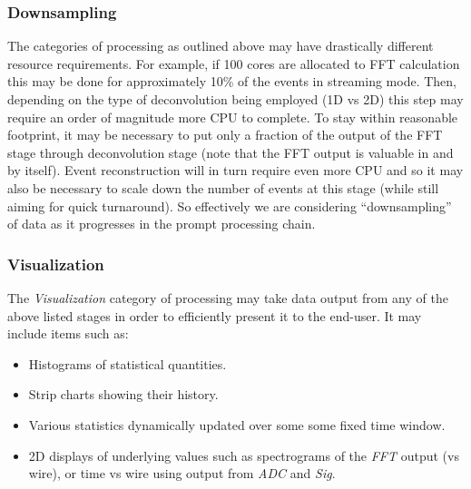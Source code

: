 \documentclass[pdftex,12pt,letter]{article}
\begin{document}
\subsubsection{Downsampling}
\label{sec:downsampling}
The categories of processing as outlined above may have drastically different resource requirements.
For example, if 100 cores are allocated to FFT calculation this may be done for approximately 10\% of the events
in streaming mode. Then, depending on the type of deconvolution being employed (1D vs 2D) this step
may require an order of magnitude more CPU to complete. To stay within reasonable footprint,
it may be necessary to put only a fraction of the output of the FFT stage through deconvolution stage
(note that the FFT output is valuable in and by itself). Event reconstruction will in turn require even more CPU
and so it may also be necessary to scale down the number of
events at this stage (while still aiming for quick turnaround). So effectively we are considering ``downsampling''
of data as it progresses in the prompt processing chain.



\subsubsection{Visualization}
The \textit{Visualization} category of processing
 may take data output from any of the above listed stages in
order to efficiently present it to the end-user. 
It may include items such as:

\begin{itemize}

\item Histograms of statistical quantities.

\item Strip charts showing their history.

\item Various statistics dynamically updated over some some fixed time window.

\item 2D displays of underlying values such as spectrograms of the \textit{FFT}
  output (vs wire), or time vs wire using output from \textit{ADC} and \textit{Sig}.

\end{itemize}
\end{document}
